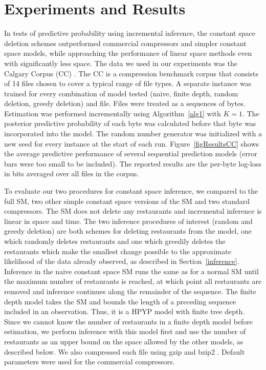 \section{Experiments and Results}
\label{results}

In tests of predictive probability using incremental inference, the constant space deletion schemes outperformed commercial compressors and simpler constant space models, while approaching the performance of linear space methods even with significantly less space.  The data we used in our experiments was the Calgary Corpus (CC) \cite{Bell1989}.  The CC is a compression benchmark corpus that consists of 14 files chosen to cover a typical range of file types.  A separate instance was trained for every combination of model tested (naive, finite depth, random deletion, greedy deletion) and file.  Files were treated as a sequences of bytes.  Estimation was performed incrementally using Algorithm~\ref{alg1} with $K=1$. The posterior predictive probability of each byte was calculated before that byte was incorporated into the model.  The random number generator was initialized with a new seed for every instance at the start of each run.  Figure~\ref{figResultsCC} shows the average predictive performance of several sequential prediction models (error bars were too small to be included).  The reported results are the per-byte log-loss in bits averaged over all files in the corpus.  


To evaluate our two procedures for constant space inference, we compared to the full SM, two other simple constant space versions of the SM and two standard compressors.  The SM does not delete any restaurants and incremental inference is linear in space and time.  The two inference procedures of interest (random and greedy deletion) are both schemes for deleting restaurants from the model, one which randomly deletes restaurants and one which greedily deletes the restaurants which make the smallest change possible to the approximate likelihood of the data already observed, as described in Section~\ref{inference}.  Inference in the naive constant space SM runs the same as for a normal SM until the maximum number of restaurants is reached, at which point all restaurants are removed and inference continues along the remainder of the sequence.  The finite depth model takes the SM and bounds the length of a preceding sequence included in an observation.  Thus, it is a HPYP model with finite tree depth.  Since we cannot know the number of restaurants in a finite depth model before estimation, we perform inference with this model first and use the number of restaurants as an upper bound on the space allowed by the other models, as described below.  We also compressed each file using gzip and bzip2 \cite{Deutsch1996, Seward1999}.  Default parameters were used for the commercial compressors.

